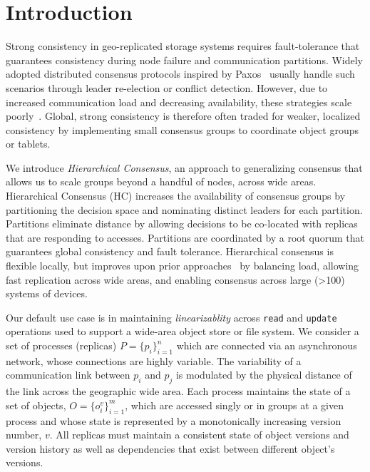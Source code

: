 \documentclass[sigconf]{acmart}
\begin{document}


\maketitle

\section{Introduction}

Strong consistency in geo-replicated storage systems requires fault-tolerance that
guarantees consistency during node failure and communication partitions.
Widely adopted distributed consensus protocols inspired by Paxos~\cite{lamport_paxos_2001}
usually handle such scenarios through leader re-election or conflict detection.
However, due to increased communication load and decreasing availability, these
strategies scale poorly~\cite{2016arXiv160806696H}.
Global, strong consistency is therefore often traded for weaker, localized
consistency by implementing small consensus groups to coordinate object groups or
tablets.

We introduce \emph{Hierarchical Consensus}, an approach to generalizing
consensus that allows us to scale groups beyond a handful of nodes, across
wide areas.
Hierarchical Consensus (HC) increases the availability of consensus groups by
partitioning the decision space and nominating distinct leaders for each
partition.
Partitions eliminate distance by allowing decisions to be co-located with
replicas that are responding to accesses.
Partitions are coordinated by a root quorum that guarantees global consistency and fault
tolerance.
Hierarchical consensus is flexible locally, but improves upon prior
approaches~\cite{biely_s-paxos:_2012,mao_mencius:_2008,moraru_there_2013,kraska_mdcc:_2013}
by balancing load, allowing fast replication across wide areas, and enabling
consensus across large (\textgreater 100) systems of devices.

Our default use case is in maintaining \emph{linearizablity} across
\texttt{read} and \texttt{update} operations used to support a wide-area
object store or file system.
We consider a set of processes (replicas) $P = \{p_i\}_{i=1}^n$ which are connected via
an asynchronous network, whose connections are highly variable.
The variability of a communication link between $p_i$ and $p_j$ is modulated
by the physical distance of the link across the geographic wide area.
Each process maintains the state of a set of objects, $O = \{o_i^v\}_{i=1}^m$,
which are accessed singly or in groups at a given process and whose state is
represented by a monotonically increasing version number, $v$.
All replicas must maintain a consistent state of object versions and version history as
well as dependencies that exist between different object's versions.
\end{document}
